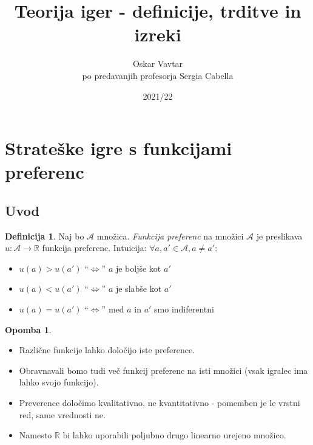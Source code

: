 \documentclass[11pt]{article}
\title{Teorija iger - definicije, trditve in izreki}
\author{Oskar Vavtar \\
po predavanjih profesorja Sergia Cabella}
\date{2021/22}
\newcommand{\R}{\mathbb{R}}
\newcommand{\A}{\mathcal{A}}
\theoremstyle{definition}
\newtheorem{definicija}{Definicija}[section]
\theoremstyle{definition}
\theoremstyle{definition}
\theoremstyle{definition}
\newtheorem*{opomba}{Opomba}
\begin{document}
\maketitle
\pagebreak
\tableofcontents
\pagebreak


\section{Strateške igre s funkcijami preferenc}
\vspace{0.5cm}


\subsection{Uvod}
\vspace{0.5cm}

\begin{definicija}

Naj bo $\A$ množica. \textit{Funkcija preferenc} na množici $\A$ je preslikava $u: \A \rightarrow \R$ funkcija preferenc. Intuicija: $\forall a,a' \in \A, a \neq a'$:
\begin{itemize}
	\item $u(a)>u(a')$ ``$\iff$'' $a$ je boljše kot $a'$
	\item $u(a)<u(a')$ ``$\iff$'' $a$ je slabše kot $a'$
	\item $u(a)=u(a')$ ``$\iff$'' med $a$ in $a'$ smo indiferentni
\end{itemize}

\end{definicija}
\vspace{0.5cm}

\begin{opomba}
~
\begin{itemize}
	\item Različne funkcije lahko določijo iste preference.
	\item Obravnavali bomo tudi več funkcij preferenc na isti množici (vsak igralec ima lahko svojo funkcijo).
	\item Preverence določimo kvalitativno, ne kvantitativno - pomemben je le vrstni red, same vrednosti ne.
	\item Namesto $\R$ bi lahko uporabili poljubno drugo linearno urejeno množico.
\end{itemize}

\end{opomba} 
\vspace{0.5cm}
\end{document}
